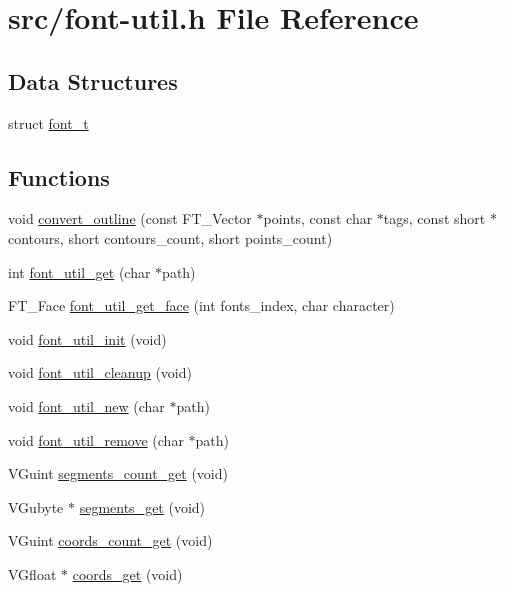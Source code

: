 \hypertarget{font-util_8h}{}\section{src/font-\/util.h File Reference}
\label{font-util_8h}
\subsection*{Data Structures}
\begin{DoxyCompactItemize}
\item 
struct \hyperlink{structfont__t}{font\+\_\+t}
\end{DoxyCompactItemize}
\subsection*{Functions}
\begin{DoxyCompactItemize}
\item 
void \hyperlink{font-util_8h_a2e1f4f43990064db73c98ffb44b99201}{convert\+\_\+outline} (const F\+T\+\_\+\+Vector $\ast$points, const char $\ast$tags, const short $\ast$contours, short contours\+\_\+count, short points\+\_\+count)
\item 
int \hyperlink{font-util_8h_ab67157cbf375fb8580de7c957fbd3626}{font\+\_\+util\+\_\+get} (char $\ast$path)
\item 
F\+T\+\_\+\+Face \hyperlink{font-util_8h_a17cd259b0b9dd2e02bd08f7f3f3c5b58}{font\+\_\+util\+\_\+get\+\_\+face} (int fonts\+\_\+index, char character)
\item 
void \hyperlink{font-util_8h_ace26dcda0550c0649bdfd9168e963c27}{font\+\_\+util\+\_\+init} (void)
\item 
void \hyperlink{font-util_8h_ab1a9b6e2faff61b99fc4302f6388c352}{font\+\_\+util\+\_\+cleanup} (void)
\item 
void \hyperlink{font-util_8h_a8c16da6fd800e231ec79a4f3a6b8b70a}{font\+\_\+util\+\_\+new} (char $\ast$path)
\item 
void \hyperlink{font-util_8h_a4187fe09f2ceb1ed6ec21a877521aaf2}{font\+\_\+util\+\_\+remove} (char $\ast$path)
\item 
V\+Guint \hyperlink{font-util_8h_a3f7b521baa3aabbf1cfdb95366d8c6a1}{segments\+\_\+count\+\_\+get} (void)
\item 
V\+Gubyte $\ast$ \hyperlink{font-util_8h_a172b6b169cd4108eaa3412788db42220}{segments\+\_\+get} (void)
\item 
V\+Guint \hyperlink{font-util_8h_a684c2dd54133ee0f96fa398f00e9dbd7}{coords\+\_\+count\+\_\+get} (void)
\item 
V\+Gfloat $\ast$ \hyperlink{font-util_8h_a0da680a50f460d392d95aacde6ecdbba}{coords\+\_\+get} (void)
\end{DoxyCompactItemize}


